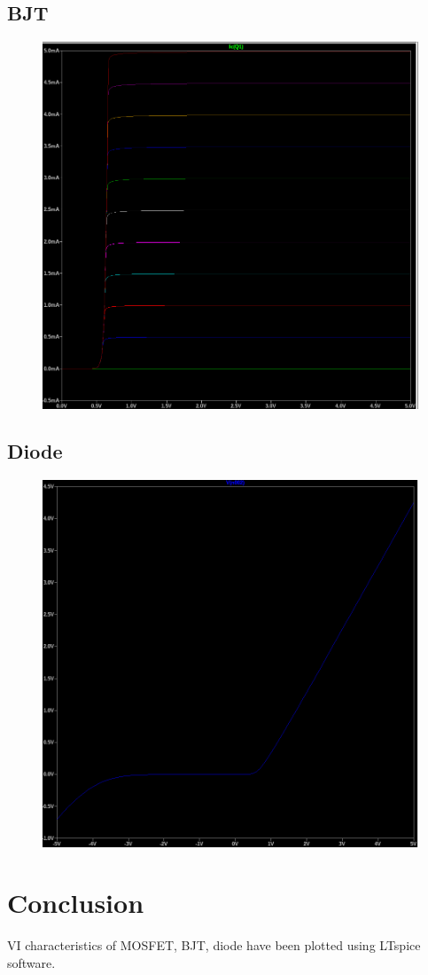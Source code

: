 \documentclass[12pt,a4paper]{report}
\begin{document}
    \subsection{BJT}
    \begin{figure}[h!]
        \centering
        \includegraphics[width=1\linewidth]{figs/bjt-plot.png}
    \end{figure}
    \pagebreak
    \subsection{Diode}
    \begin{figure}[h!]
        \centering
        \includegraphics[width=1\linewidth]{figs/diode-plot.png}
    \end{figure}
\section{Conclusion}
VI characteristics of MOSFET, BJT, diode have been plotted using LTspice software.
\end{document}
